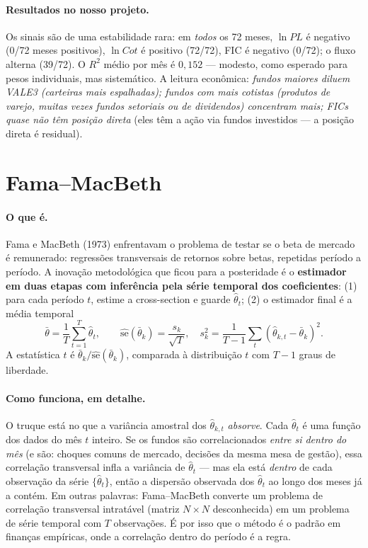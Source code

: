 \documentclass[11pt,a4paper]{article}
\newcommand{\oquee}[0]{\paragraph{O que é.}}
\newcommand{\comofunciona}[0]{\paragraph{Como funciona, em detalhe.}}
\newcommand{\resultados}[0]{\paragraph{Resultados no nosso projeto.}}
\begin{document}
\resultados Os sinais são de uma estabilidade rara: em \emph{todos} os 72 meses, $\ln PL$ é
negativo (0/72 meses positivos), $\ln Cot$ é positivo (72/72), FIC é negativo (0/72); o fluxo
alterna (39/72). O $R^2$ médio por mês é $0{,}152$ --- modesto, como esperado para pesos
individuais, mas sistemático. A leitura econômica: \emph{fundos maiores diluem VALE3 (carteiras
mais espalhadas); fundos com mais cotistas (produtos de varejo, muitas vezes fundos setoriais ou
de dividendos) concentram mais; FICs quase não têm posição direta} (eles têm a ação via fundos
investidos --- a posição direta é residual).

\section{Fama--MacBeth}
\label{sec:fm}

\oquee Fama e MacBeth (1973) enfrentavam o problema de testar se o beta de mercado é remunerado:
regressões transversais de retornos sobre betas, repetidas período a período. A inovação
metodológica que ficou para a posteridade é o \textbf{estimador em duas etapas com inferência pela
série temporal dos coeficientes}: (1) para cada período $t$, estime a cross-section e guarde
$\widehat\theta_t$; (2) o estimador final é a média temporal
\begin{equation}
\bar\theta = \frac{1}{T}\sum_{t=1}^{T}\widehat\theta_t,
\qquad
\widehat{\mathrm{se}}(\bar\theta_k) = \frac{s_k}{\sqrt{T}},
\quad s_k^2=\frac{1}{T-1}\sum_t(\widehat\theta_{k,t}-\bar\theta_k)^2 .
\label{eq:fmse}
\end{equation}
A estatística $t$ é $\bar\theta_k/\widehat{\mathrm{se}}(\bar\theta_k)$, comparada à distribuição
$t$ com $T-1$ graus de liberdade.

\comofunciona O truque está no que a variância amostral dos $\widehat\theta_{k,t}$ \emph{absorve}.
Cada $\widehat\theta_t$ é uma função dos dados do mês $t$ inteiro. Se os fundos são
correlacionados \emph{entre si dentro do mês} (e são: choques comuns de mercado, decisões da mesma
mesa de gestão), essa correlação transversal infla a variância de $\widehat\theta_t$ --- mas ela
está \emph{dentro} de cada observação da série $\{\widehat\theta_t\}$, então a dispersão observada
dos $\widehat\theta_t$ ao longo dos meses já a contém. Em outras palavras: Fama--MacBeth converte
um problema de correlação transversal intratável (matriz $N\times N$ desconhecida) em um problema
de série temporal com $T$ observações. É por isso que o método é o padrão em finanças empíricas,
onde a correlação dentro do período é a regra.
\end{document}
